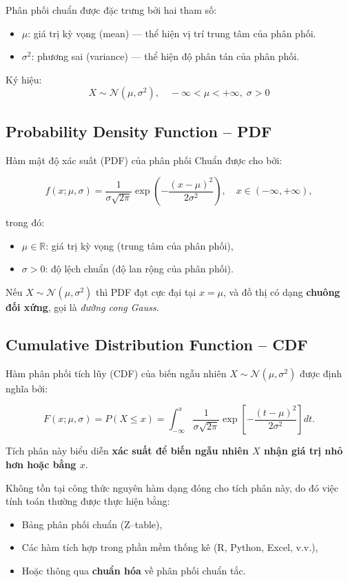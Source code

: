 \documentclass[a4paper,12pt]{article}
\begin{document}
Phân phối chuẩn được đặc trưng bởi hai tham số:
\begin{itemize}
    \item $\mu$: giá trị kỳ vọng (mean) — thể hiện vị trí trung tâm của phân phối.
    \item $\sigma^2$: phương sai (variance) — thể hiện độ phân tán của phân phối.
\end{itemize}
Ký hiệu:
\[
X \sim \mathcal{N}(\mu,\sigma^2), \quad -\infty < \mu < +\infty, \; \sigma > 0
\]


\subsection{Probability Density Function – PDF}

Hàm mật độ xác suất (PDF) của phân phối Chuẩn được cho bởi:

\[
f(x;\mu,\sigma) = \frac{1}{\sigma\sqrt{2\pi}}
\exp\left(-\frac{(x-\mu)^2}{2\sigma^2}\right), \quad x \in (-\infty, +\infty),
\]

trong đó:
\begin{itemize}
    \item \(\mu \in \mathbb{R}\): giá trị kỳ vọng (trung tâm của phân phối),
    \item \(\sigma > 0\): độ lệch chuẩn (độ lan rộng của phân phối).
\end{itemize}

Nếu \( X \sim \mathcal{N}(\mu,\sigma^2) \) thì PDF đạt cực đại tại \( x = \mu \), và đồ thị có dạng \textbf{chuông đối xứng}, gọi là \textit{đường cong Gauss}.


\subsection{Cumulative Distribution Function – CDF}

Hàm phân phối tích lũy (CDF) của biến ngẫu nhiên \( X \sim \mathcal{N}(\mu,\sigma^2) \) được định nghĩa bởi:

\[
F(x;\mu,\sigma) = P(X \le x) 
= \int_{-\infty}^x \frac{1}{\sigma\sqrt{2\pi}}
\exp\left[-\frac{(t-\mu)^2}{2\sigma^2}\right] dt.
\]

Tích phân này biểu diễn \textbf{xác suất để biến ngẫu nhiên \(X\) nhận giá trị nhỏ hơn hoặc bằng \(x\)}.

Không tồn tại công thức nguyên hàm dạng đóng cho tích phân này, do đó việc tính toán thường được thực hiện bằng:
\begin{itemize}
    \item Bảng phân phối chuẩn (Z–table),
    \item Các hàm tích hợp trong phần mềm thống kê (R, Python, Excel, v.v.),
    \item Hoặc thông qua \textbf{chuẩn hóa} về phân phối chuẩn tắc.
\end{itemize}
\end{document}
